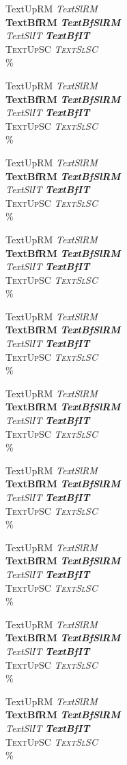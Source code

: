 \documentclass[10pt,a5paper]{article}
\newcommand{\FontCombDemo}{%
  \textup{\textrm{TextUpRM}} \textsl{TextSlRM}\\\textbf{TextBfRM} \textbf{\textsl{TextBfSlRM}}\\[1ex]%
  \textit{TextSlIT} \textit{\textbf{TextBfIT}}\\[1ex]%
  \textsc{TextUpSC} \textsl{\textsc{TextSlSC}}\\[1ex]\%
}
\begin{document}
{\tiny\FontCombDemo}

{\scriptsize\FontCombDemo}

{\footnotesize\FontCombDemo}

{\small\FontCombDemo}

{\normalsize\FontCombDemo}

{\large\FontCombDemo}

{\Large\FontCombDemo}

{\LARGE\FontCombDemo}

{\huge\FontCombDemo}

{\Huge\FontCombDemo}
\end{document}
